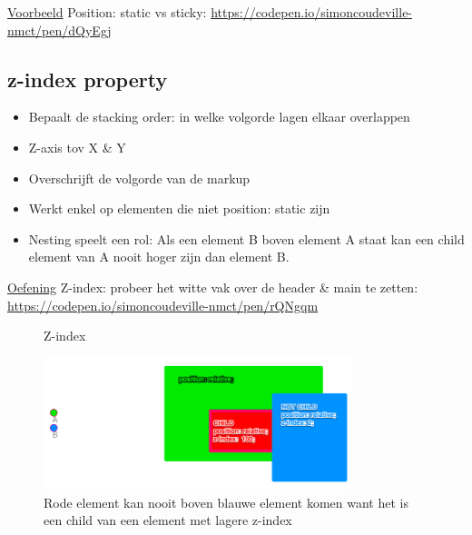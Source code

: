 \documentclass{article}
\begin{document}
\underline{Voorbeeld} Position: static vs sticky: \url{https://codepen.io/simoncoudeville-nmct/pen/dQyEgj}

\subsection{z-index property}
\begin{itemize}
    \item Bepaalt de stacking order: in welke volgorde lagen elkaar overlappen
    \item Z-axis tov X \& Y
    \item Overschrijft de volgorde van de markup
    \item Werkt enkel op elementen die niet position: static zijn
    \item Nesting speelt een rol: Als een element B boven element A staat kan een child element van A nooit hoger zijn dan element B.
\end{itemize}

\underline{Oefening} Z-index: probeer het witte vak over de header \& main te zetten: \url{https://codepen.io/simoncoudeville-nmct/pen/rQNgqm}

\begin{figure}[H]
    \centering
    \caption{Z-index}    
\end{figure}

\begin{figure}[H]
    \centering
    \includegraphics[width=0.8\textwidth]{img/Screenshot_20200323_085610.png}
    \caption{Rode element kan nooit boven blauwe element komen want het is een child van een element met lagere z-index}    
\end{figure}
\end{document}
